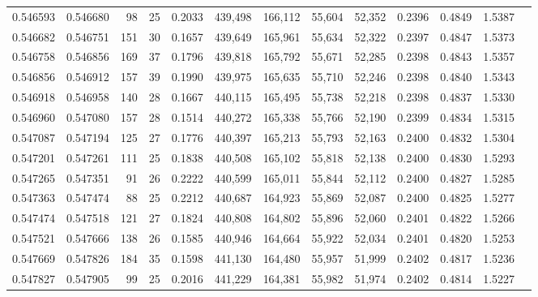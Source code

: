 \begin{tabular}{rrrrrrrrrrrrr}
0.546593 & 0.546680 &  98 &  25 &                                     0.2033 & 439,498 & 166,112 &  55,604 &  52,352 & 0.2396 & 0.4849 & 1.5387 \\
0.546682 & 0.546751 & 151 &  30 &                                     0.1657 & 439,649 & 165,961 &  55,634 &  52,322 & 0.2397 & 0.4847 & 1.5373 \\
0.546758 & 0.546856 & 169 &  37 &                                     0.1796 & 439,818 & 165,792 &  55,671 &  52,285 & 0.2398 & 0.4843 & 1.5357 \\
0.546856 & 0.546912 & 157 &  39 &                                     0.1990 & 439,975 & 165,635 &  55,710 &  52,246 & 0.2398 & 0.4840 & 1.5343 \\
0.546918 & 0.546958 & 140 &  28 &                                     0.1667 & 440,115 & 165,495 &  55,738 &  52,218 & 0.2398 & 0.4837 & 1.5330 \\
0.546960 & 0.547080 & 157 &  28 &                                     0.1514 & 440,272 & 165,338 &  55,766 &  52,190 & 0.2399 & 0.4834 & 1.5315 \\
0.547087 & 0.547194 & 125 &  27 &                                     0.1776 & 440,397 & 165,213 &  55,793 &  52,163 & 0.2400 & 0.4832 & 1.5304 \\
0.547201 & 0.547261 & 111 &  25 &                                     0.1838 & 440,508 & 165,102 &  55,818 &  52,138 & 0.2400 & 0.4830 & 1.5293 \\
0.547265 & 0.547351 &  91 &  26 &                                     0.2222 & 440,599 & 165,011 &  55,844 &  52,112 & 0.2400 & 0.4827 & 1.5285 \\
0.547363 & 0.547474 &  88 &  25 &                                     0.2212 & 440,687 & 164,923 &  55,869 &  52,087 & 0.2400 & 0.4825 & 1.5277 \\
0.547474 & 0.547518 & 121 &  27 &                                     0.1824 & 440,808 & 164,802 &  55,896 &  52,060 & 0.2401 & 0.4822 & 1.5266 \\
0.547521 & 0.547666 & 138 &  26 &                                     0.1585 & 440,946 & 164,664 &  55,922 &  52,034 & 0.2401 & 0.4820 & 1.5253 \\
0.547669 & 0.547826 & 184 &  35 &                                     0.1598 & 441,130 & 164,480 &  55,957 &  51,999 & 0.2402 & 0.4817 & 1.5236 \\
0.547827 & 0.547905 &  99 &  25 &                                     0.2016 & 441,229 & 164,381 &  55,982 &  51,974 & 0.2402 & 0.4814 & 1.5227 \\

\end{tabular}
